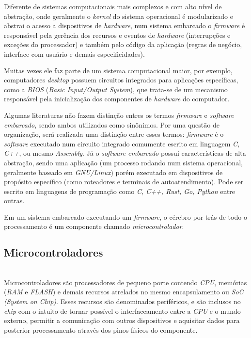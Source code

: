 \documentclass[times, twoside, watermark]{artigo}
\begin{document}
Diferente de sistemas computacionais mais complexos e com alto nível de abstração,
onde geralmente o \textit{kernel} do sistema operacional é modularizado e abstrai
o acesso a dispositivos de \textit{hardware}\cite{tanenbaum2015modern},
num sistema embarcado o \textit{firmware} é responsável pela gerência dos recursos 
e eventos de \textit{hardware} (interrupções e exceções do processador) e também
pelo código da aplicação (regras de negócio, interface com usuário e demais 
especificidades).

Muitas vezes ele faz parte de um sistema computacional maior,
por exemplo, computadores \textit{desktop} possuem circuitos integrados para 
aplicações específicas, como a \textit{BIOS} (\textit{Basic Input/Output System}),
que trata-se de um mecanismo responsável pela inicialização dos
componentes de \textit{hardware} do computador. \cite{terzicbasic}

Algumas literaturas não fazem distinção entres os termos \textit{firmware} e 
\textit{software embarcado}, sendo ambos utilizados como sinônimos. Por uma
questão de organização, será realizada uma distinção entre
esses termos: \textit{firmware} é o \textit{software} executado num circuito 
integrado comumente escrito em linguagem \textit{C, C++}, ou mesmo \textit{Assembly}. 
Já o \textit{software embarcado} possui características de alta abstração, 
sendo uma aplicação (um processo rodando num sistema operacional, 
geralmente baseado em \textit{GNU/Linux})\cite{simmonds2015mastering} porém executado 
em dispositivos de propósito específico (como roteadores e terminais de 
autoatendimento). 
Pode ser escrito em linguagens de programação como \textit{C, C++, Rust, Go, Python} 
entre outras.

Em um sistema embarcado executando um \textit{firmware}, o cérebro por trás de todo o 
processamento é um componente chamado \textit{microcontrolador}.

\subsection{Microcontroladores}\hfill\\

Microcontroladores são processadores de pequeno porte contendo \textit{CPU}, 
memórias (\textit{RAM} e \textit{FLASH}) e demais
recursos atrelados no mesmo encapsulamento ou \textit{SoC (System on Chip)}.
Esses recursos são denominados periféricos, e são inclusos no \textit{chip} 
com o intuito de tornar possível o interfaceamento entre a \textit{CPU} 
e o mundo externo, permitir a comunicação com outros dispositivos e 
aquisitar dados para posterior processamento através dos pinos físicos do componente.
\end{document}
